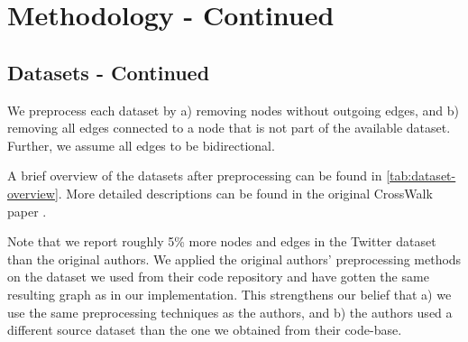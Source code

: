 \clearpage

\section{Methodology - Continued}
\label{sec:methodology-cont}
\subsection{Datasets - Continued}
\label{subsec:datasets-cont}
We preprocess each dataset by a) removing nodes without outgoing edges, and b) removing all edges connected to a node that is not part of the available dataset. 
Further, we assume all edges to be bidirectional.

A brief overview of the datasets after preprocessing can be found in \autoref{tab:dataset-overview}. More detailed descriptions can be found in the original CrossWalk paper \cite{Khajehnejad2022}. 

Note that we report roughly 5\% more nodes and edges in the Twitter dataset than the original authors. We applied the original authors' preprocessing methods on the dataset we used from their code repository and have gotten the same resulting graph as in our implementation. This strengthens our belief that a) we use the same preprocessing techniques as the authors, and b) the authors used a different source dataset than the one we obtained from their code-base.

